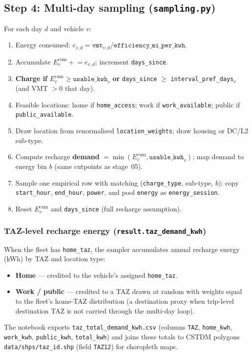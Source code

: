 \documentclass[11pt,a4paper]{article}
\begin{document}
\subsection{Step 4: Multi-day sampling (\texttt{sampling.py})}
For each day $d$ and vehicle $v$:
\begin{enumerate}[noitemsep]
  \item Energy consumed: $e_{v,d} = \texttt{vmt}_{v,d} / \texttt{efficiency\_mi\_per\_kwh}$.
  \item Accumulate $E^{\text{cum}}_{v} \mathrel{+}= e_{v,d}$; increment \texttt{days\_since}.
  \item \textbf{Charge if} $E^{\text{cum}}_{v} \ge \texttt{usable\_kwh}_v$ \textbf{or} \texttt{days\_since} $\ge$ \texttt{interval\_pref\_days}$_v$ (and VMT $>0$ that day).
  \item Feasible locations: home if \texttt{home\_access}; work if \texttt{work\_available}; public if \texttt{public\_available}.
  \item Draw location from renormalised \texttt{location\_weights}; draw housing or DC/L2 sub-type.
  \item Compute recharge \textbf{demand} $= \min(E^{\text{cum}}_{v}, \texttt{usable\_kwh}_v)$; map demand to energy bin $b$ (same cutpoints as stage~05).
  \item Sample one empirical row with matching (\texttt{charge\_type}, sub-type, $b$); copy \texttt{start\_hour}, \texttt{end\_hour}, \texttt{power}, and pool \texttt{energy} as \texttt{energy\_session}.
  \item Reset $E^{\text{cum}}_{v}$ and \texttt{days\_since} (full recharge assumption).
\end{enumerate}

\subsubsection{TAZ-level recharge energy (\texttt{result.taz\_demand\_kwh})}
When the fleet has \texttt{home\_taz}, the sampler accumulates annual recharge energy (kWh) by TAZ and location type:
\begin{itemize}[noitemsep]
  \item \textbf{Home} --- credited to the vehicle's assigned \texttt{home\_taz}.
  \item \textbf{Work / public} --- credited to a TAZ drawn at random with weights equal to the fleet's home-TAZ distribution (a destination proxy when trip-level destination TAZ is not carried through the multi-day loop).
\end{itemize}
The notebook exports \texttt{taz\_total\_demand\_kwh.csv} (columns \texttt{TAZ}, \texttt{home\_kwh}, \texttt{work\_kwh}, \texttt{public\_kwh}, \texttt{total\_kwh}) and joins these totals to CSTDM polygons \texttt{data/shps/taz\_id.shp} (field \texttt{TAZ12}) for choropleth maps.
\label{sec:simulation-taz}
\end{document}
